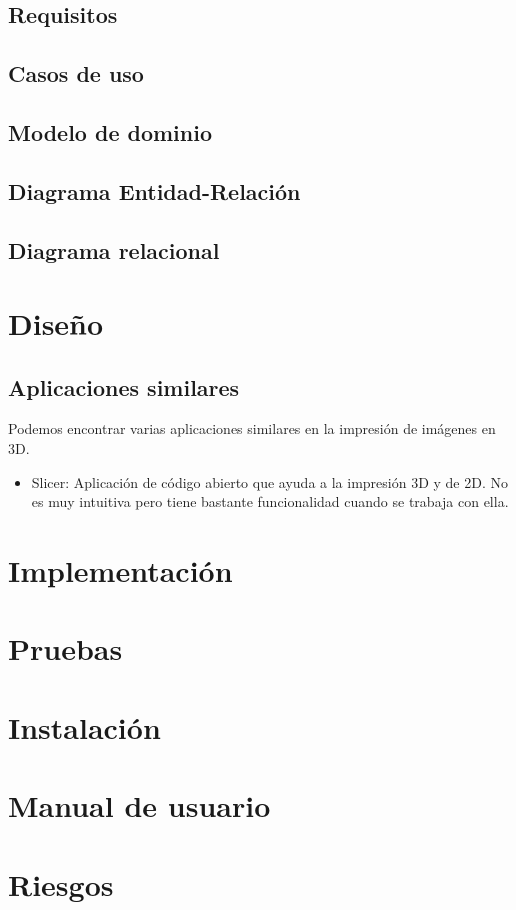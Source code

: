 \documentclass[a4paper,11pt, twoside]{article}
\begin{document}
\subsection{Requisitos}
\subsection{Casos de uso}
\subsection{Modelo de dominio}
\subsection{Diagrama Entidad-Relación}
\subsection{Diagrama relacional}
\section{Diseño}
\subsection{Aplicaciones similares}
Podemos encontrar varias aplicaciones similares en la impresión de imágenes en 3D.
\vspace{-2.5mm}
\begin{itemize}[noitemsep,topsep=0pt]
\item Slicer: Aplicación de código abierto que ayuda a la impresión 3D y de 2D. No es muy intuitiva pero tiene bastante funcionalidad cuando se trabaja con ella.
\end{itemize}
\section{Implementación}
\section{Pruebas}
\section{Instalación}
\section{Manual de usuario}
\section{Riesgos}
\end{document}
